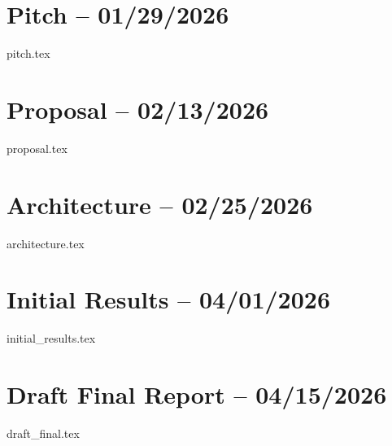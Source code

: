 {\raggedright

\section*{\Centering Pitch -- \footnotesize 01/29/2026}
 \vspace{2ex}
{pitch.tex}

\feedbackdividerfancy

\section*{\Centering Proposal -- \footnotesize 02/13/2026}
 \vspace{2ex}
{proposal.tex}

\feedbackdividerfancy

\section*{Architecture -- \footnotesize 02/25/2026}
 \vspace{2ex}
{architecture.tex}

\feedbackdividerfancy

\section*{Initial Results -- \footnotesize 04/01/2026}
 \vspace{2ex}
{initial_results.tex}

\feedbackdividerfancy

\section*{Draft Final Report -- \footnotesize 04/15/2026}
 \vspace{2ex}
{draft_final.tex}

\feedbackdividerfancy

}

